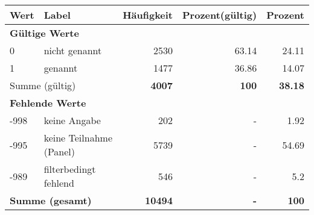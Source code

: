      \begin{longtable}{lXrrr}
     \toprule
     \textbf{Wert} & \textbf{Label} & \textbf{Häufigkeit} & \textbf{Prozent(gültig)} & \textbf{Prozent} \\
     \endhead
     \midrule
     \multicolumn{5}{l}{\textbf{Gültige Werte}}\\

     0 &
     \multicolumn{1}{X}{ nicht genannt   } &


       \num{2530} &
       \num[round-mode=places,round-precision=2]{63,14} &
         \num[round-mode=places,round-precision=2]{24,11} \\

     1 &
     \multicolumn{1}{X}{ genannt   } &


       \num{1477} &
       \num[round-mode=places,round-precision=2]{36,86} &
         \num[round-mode=places,round-precision=2]{14,07} \\
     \midrule
     \multicolumn{2}{l}{Summe (gültig)} &
       \textbf{\num{4007}} &
     \textbf{100} &
       \textbf{\num[round-mode=places,round-precision=2]{38,18}} \\
     \multicolumn{5}{l}{\textbf{Fehlende Werte}}\\
       -998 &
       keine Angabe &
         \num{202} &
        - &
         \num[round-mode=places,round-precision=2]{1,92} \\
       -995 &
       keine Teilnahme (Panel) &
         \num{5739} &
        - &
         \num[round-mode=places,round-precision=2]{54,69} \\
       -989 &
       filterbedingt fehlend &
         \num{546} &
        - &
         \num[round-mode=places,round-precision=2]{5,2} \\
     \midrule
     \multicolumn{2}{l}{\textbf{Summe (gesamt)}} &
          \textbf{\num{10494}} &
        \textbf{-} &
        \textbf{100} \\
     \bottomrule
     \end{longtable}
     
